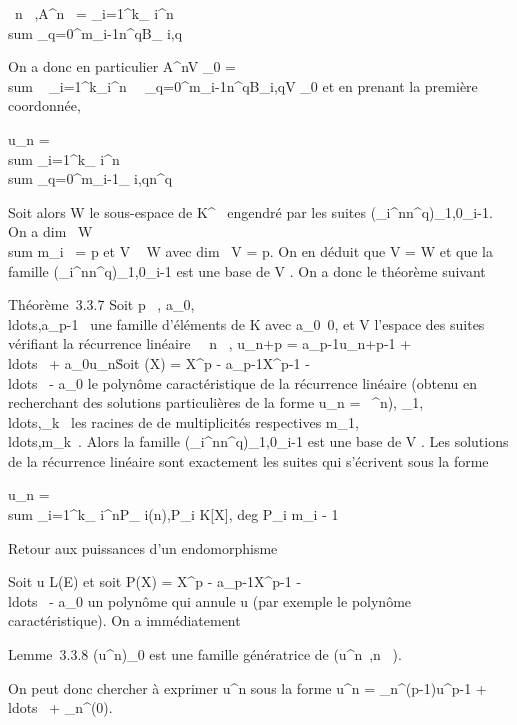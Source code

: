\documentclass[]{article}
\begin{document}
\forall~n \in {}~,\quad A^n~ =
\sum _i=1^k\lambda_ i^n~
\\sum
_q=0^m_i-1n^qB_ i,q

On a donc en particulier A^nV _0
= \\sum ~
_i=1^k\lambda_i^n\
\sum ~
_q=0^m_i-1n^qB_i,qV
_0 et en prenant la première coordonnée,

u_n = \\sum
_i=1^k\lambda_ i^n \\sum
_q=0^m_i-1\alpha_ i,qn^q

Soit alors W le sous-espace de K^~ engendré par les suites
(\lambda_i^nn^q)_1\leqi\leqk,0\leqq\leqm_i-1.
On a dim~ W
\leq\\sum  m_i~ = p
et V \subset~ W avec dim~ V = p. On en déduit que V =
W et que la famille
(\lambda_i^nn^q)_1\leqi\leqk,0\leqq\leqm_i-1
est une base de V . On a donc le théorème suivant

Théorème~3.3.7 Soit p \in {}~,
a_0,\\ldots,a_p-1~
une famille d'éléments de K avec
a_0\neq~0, et V l'espace des suites
vérifiant la récurrence linéaire \forall~~n \in {}~,
u_n+p = a_p-1u_n+p-1 +
\\ldots~ +
a_0u_n\. Soit \chi(X) = X^p -
a_p-1X^p-1
-\\ldots~ -
a_0 le polynôme caractéristique de la récurrence linéaire
(obtenu en recherchant des solutions particulières de la forme
u_n = \lambda~^n),
\lambda_1,\\ldots,\lambda_k~
les racines de \chi de multiplicités respectives
m_1,\\ldots,m_k~.
Alors la famille
(\lambda_i^nn^q)_1\leqi\leqk,0\leqq\leqm_i-1
est une base de V . Les solutions de la récurrence linéaire sont
exactement les suites qui s'écrivent sous la forme

u_n = \\sum
_i=1^k\lambda_ i^nP_
i(n),\quad P_i \in K{[}X{]}, deg P_i \leq
m_i - 1

Retour aux puissances d'un endomorphisme

Soit u \in L(E) et soit P(X) = X^p -
a_p-1X^p-1
-\\ldots~ -
a_0 un polynôme qui annule u (par exemple le polynôme
caractéristique). On a immédiatement

Lemme~3.3.8 (u^n)_0\leqn{} est une famille
génératrice de
\mathrmVect(u^n~,n
\in {}~).

On peut donc chercher à exprimer u^n sous la forme
u^n = \alpha_n^(p-1)u^p-1 +
\\ldots~ +
\alpha_n^(0)\mathrmId.
\end{document}
